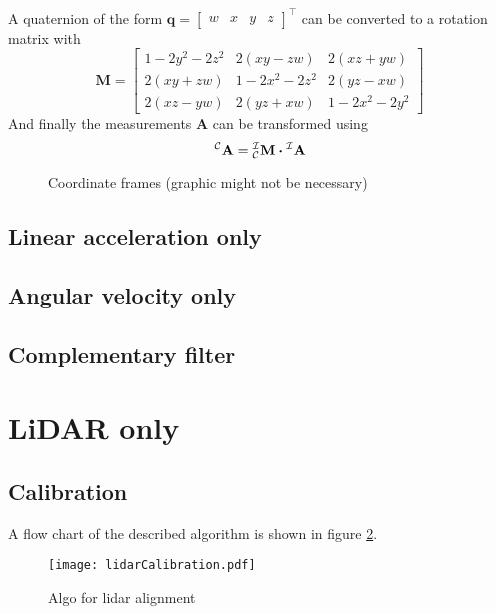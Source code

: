 A quaternion of the form
$\mathbf{q} = \left[\begin{array}{llll} w & x & y & z \end{array}\right]^{\top}$
can be converted to a rotation matrix with
\begin{equation}
    \mathbf{M} =
    \left[
        \begin{array}{ccc}
            1-2 y^{2}-2 z^{2} & 2(x y-z w) & 2(x z+y w) \\
            2(x y+z w) & 1-2 x^{2}-2 z^{2} & 2(y z-x w) \\
            2(x z-y w) & 2(y z+x w) & 1-2 x^{2}-2 y^{2}
        \end{array}
        \right]
    \end{equation}
And finally the measurements $\mathbf{A}$ can be transformed using
\begin{equation}
    \vincs{A}{c} = \mtf{i}{c} \vdot \vincs{A}{i}
\end{equation}

\begin{figure}[htpb]
    \centering
    
	\caption{Coordinate frames (graphic might not be necessary)}
    \label{fig:tikz_car_frames}
\end{figure}

\subsection{Linear acceleration only}


\subsection{Angular velocity only}


\subsection{Complementary filter}



\section{LiDAR only}
\subsection{Calibration}
A flow chart of the described algorithm is shown in figure \ref{fig:lidarCalibration}.
\begin{figure}[htb]
	\centering
	\texttt{[image: lidarCalibration.pdf]}
	\caption{Algo for lidar alignment}
	\label{fig:lidarCalibration}
\end{figure}



